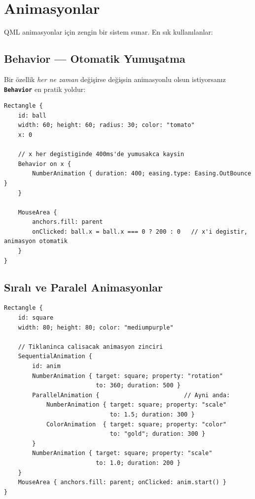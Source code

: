 \documentclass[11pt,a4paper]{article}
\newcommand{\kls}[1]{\texttt{\color{anaMavi}\textbf{#1}}}
\begin{document}
\section{Animasyonlar}

QML animasyonlar için zengin bir sistem sunar. En sık kullanılanlar:

\subsection{Behavior — Otomatik Yumuşatma}

Bir özellik \emph{her ne zaman} değişirse değişsin animasyonlu olsun istiyorsanız
\kls{Behavior} en pratik yoldur:

\begin{lstlisting}
Rectangle {
    id: ball
    width: 60; height: 60; radius: 30; color: "tomato"
    x: 0

    // x her degistiginde 400ms'de yumusakca kaysin
    Behavior on x {
        NumberAnimation { duration: 400; easing.type: Easing.OutBounce }
    }

    MouseArea {
        anchors.fill: parent
        onClicked: ball.x = ball.x === 0 ? 200 : 0   // x'i degistir, animasyon otomatik
    }
}
\end{lstlisting}

\subsection{Sıralı ve Paralel Animasyonlar}

\begin{lstlisting}
Rectangle {
    id: square
    width: 80; height: 80; color: "mediumpurple"

    // Tiklaninca calisacak animasyon zinciri
    SequentialAnimation {
        id: anim
        NumberAnimation { target: square; property: "rotation"
                          to: 360; duration: 500 }
        ParallelAnimation {                        // Ayni anda:
            NumberAnimation { target: square; property: "scale"
                              to: 1.5; duration: 300 }
            ColorAnimation  { target: square; property: "color"
                              to: "gold"; duration: 300 }
        }
        NumberAnimation { target: square; property: "scale"
                          to: 1.0; duration: 200 }
    }
    MouseArea { anchors.fill: parent; onClicked: anim.start() }
}
\end{lstlisting}
\end{document}
